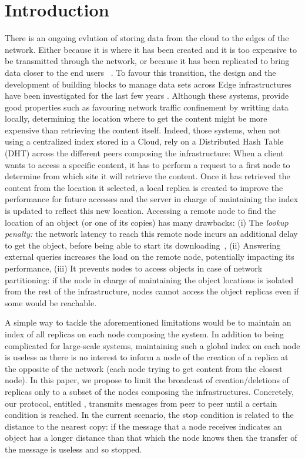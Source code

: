 
\section{Introduction}

There is an ongoing evlution of storing data from the cloud to the
edges of the network. Either because it is where it has been created
and it is too expensive to be transmitted through the network, or
because it has been replicated to bring data closer to the end users
~\cite{shi2016edge, foggy_cache, cachier}.
%
To favour this transition, the design and the development of building
blocks to manage data sets across Edge infrastructures have been
investigated for the last few years \cite{confais2017performance,
  confais2017object, fogstore, hasenburg2020towards}.  Although these systems,
provide good properties such as favouring network traffic confinement
by writting data locally, determining the location where to get the
content might be more expensive than retrieving the content itself.
%
Indeed, those systems, when not using a centralized index stored in a
Cloud, rely on a Distributed Hash Table (DHT) across the different
peers composing the infrastructure: When a client wants to access a
specific content, it has to perform a request to a first node to
determine from which site it will retrieve the content. Once it has
retrieved the content from the location it selected, a local replica
is created to improve the performance for future accesses and the
server in charge of maintaining the index is updated to reflect this
new location.
%
Accessing a remote node to find the location of an object (or one of
its copies) has many drawbacks: (i) The \textit{lookup penalty:} the
network latency to reach this remote node incurs an additional delay
to get the object, before being able to start its
downloading~\cite{asrese2019measuring, doan2019tracing}, (ii)
Answering external queries increases the load on the remote node,
potentially impacting its performance, (iii) It prevents nodes to
access objects in case of network partitioning: if the node in charge
of maintaining the object locations is isolated from the rest of the
infrastructure, nodes cannot access the object replicas even if some
would be reachable.

A simple way to tackle the aforementioned limitations would be to
maintain an index of all replicas on each node composing the
system. In addition to being complicated  for large-scale
systems, maintaining such a global index on each node is useless as there
is no interest to inform a node of the creation of a replica at the
opposite of the network (each node trying to get content from the closest node).
%
In this paper, we propose to limit the broadcast of creation/deletions
of replicas only to a subset of the nodes composing the
infrastructures.  Concretely, our protocol, entitled \NAME, transmits
messages from peer to peer until a certain condition is reached. In
the current scenario, the stop condition is related to the distance to
the nearest copy: if the message that a node receives indicates an
object has a longer distance than that which the node knows then the
transfer of the message is useless and so stopped.

